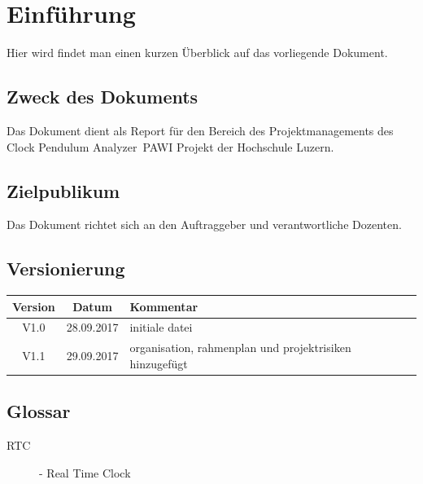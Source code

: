\documentclass[a4paper, 10pt, fleqn]{article}
\newcommand{\documenttitle}{Clock Pendulum Analyzer} %
\begin{document}
	\begin{titlepage}
		\titleGM
		\thispagestyle{empty}
	\end{titlepage}
	
	\tableofcontents
	\listoffigures
	\listoftables
	
	\clearpage
	\section{Einführung}
        Hier wird findet man einen kurzen Überblick auf das vorliegende Dokument.
		\subsection{Zweck des Dokuments}
        Das Dokument dient als Report für den Bereich des Projektmanagements des \documenttitle\ PAWI Projekt der Hochschule Luzern.
		\subsection{Zielpublikum}
        Das Dokument richtet sich an den Auftraggeber und verantwortliche Dozenten.
		\subsection{Versionierung}
			\begin{table}[h]
				\centering
				\begin{tabularx}{\textwidth}{|c|c|X|}
				\hline
				\rowcolor{shadecolor}\textbf{Version} & \textbf{Datum} & \textbf{Kommentar}\\ \hline
				V1.0 & 28.09.2017 & initiale datei \\ \hline
                V1.1 & 29.09.2017 & organisation, rahmenplan und projektrisiken hinzugefügt\\
				\end{tabularx}
			\end{table}
		\subsection{Glossar}
			\begin{description}
				\item[RTC]- Real Time Clock
			\end{description}

\end{document}
